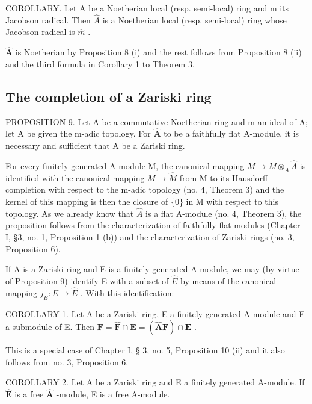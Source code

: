 COROLLARY. Let A be a Noetherian local (resp. semi-local) ring and m its Jacobson radical. Then \(\hat{A}\) is a Noetherian local (resp. semi-local) ring whose Jacobson radical is \(\hat{m}\) .

\(\hat{\mathbf{A}}\) is Noetherian by Proposition 8 (i) and the rest follows from Proposition 8 (ii) and the third formula in Corollary 1 to Theorem 3.

\subsection{The completion of a Zariski ring}

PROPOSITION 9. Let A be a commutative Noetherian ring and m an ideal of A; let A be given the m-adic topology. For \(\hat{\mathbf{A}}\) to be a faithfully flat A-module, it is necessary and sufficient that A be a Zariski ring.

For every finitely generated A-module M, the canonical mapping \(M \to M \otimes_{A} \hat{A}\) is identified with the canonical mapping \(M \to \hat{M}\) from M to its Hausdorff completion with respect to the m-adic topology (no. 4, Theorem 3) and the kernel of this mapping is then the closure of \(\{0\}\) in M with respect to this topology. As we already know that \(\hat{A}\) is a flat A-module (no. 4, Theorem 3), the proposition follows from the characterization of faithfully flat modules (Chapter I, §3, no. 1, Proposition 1 (b)) and the characterization of Zariski rings (no. 3, Proposition 6).

If A is a Zariski ring and E is a finitely generated A-module, we may (by virtue of Proposition 9) identify E with a subset of \(\hat{E}\) by means of the canonical mapping \(j_{E}: E \to \hat{E}\) . With this identification:

COROLLARY 1. Let A be a Zariski ring, E a finitely generated A-module and F a submodule of E. Then \(\mathbf{F} = \hat{\mathbf{F}} \cap \mathbf{E} = (\hat{\mathbf{A}}\mathbf{F}) \cap \mathbf{E}\) .

This is a special case of Chapter I, § 3, no. 5, Proposition 10 (ii) and it also follows from no. 3, Proposition 6.

COROLLARY 2. Let A be a Zariski ring and E a finitely generated A-module. If \(\hat{\mathbf{E}}\) is a free \(\hat{\mathbf{A}}\) -module, E is a free A-module.

